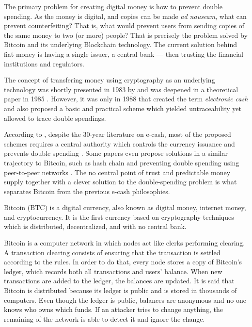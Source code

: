 The primary problem for creating digital money is how to prevent double spending. As the money is digital, and copies can be made \textit{ad nauseam}, what can prevent counterfeiting? That is, what would prevent users from sending copies of the same money to two (or more) people? That is precisely the problem solved by Bitcoin and its underlying Blockchain technology. The current solution behind fiat money is having a single issuer, a central bank --- then trusting the financial institutions and regulators.

The concept of transfering money using cryptography as an underlying technology was shortly presented in 1983 by \citet{chaum1983blind} and was deepened in a theoretical paper in 1985 \citep{chaum1985security}. However, it was only in 1988 that \citet{chaum1988untraceable} created the term \emph{electronic cash} and also proposed a basic and practical scheme which yielded untraceability yet allowed to trace double spendings.

According to \citet{barber2012bitter}, despite the 30-year literature on e-cash, most of the proposed schemes requires a central authority which controls the currency issuance and prevents double spending \citep{chaum1983blind, okamoto1995efficient, camenisch2005compact, canard2007divisible}. Some papers even propose solutions in a similar trajectory to Bitcoin, such as hash chain \citep{zongkai2004new} and preventing double spending using peer-to-peer networks \citet{osipkov2007combating, hoepman2007distributed}. The no central point of trust and predictable money supply together with a clever solution to the double-spending problem is what separates Bitcoin from the previous e-cash philosophies.

Bitcoin (BTC) is a digital currency, also known as digital money, internet money, and cryptocurrency. It is the first currency based on cryptography techniques which is distributed, decentralized, and with no central bank.

Bitcoin is a computer network in which nodes act like clerks performing clearing. A transaction clearing consists of ensuring that the transaction is settled according to the rules. In order to do that, every node stores a copy of Bitcoin's ledger, which records both all transactions and users' balance. When new transactions are added to the ledger, the balances are updated. It is said that Bitcoin is distributed because its ledger is public and is stored in thousands of computers. Even though the ledger is public, balances are anonymous and no one knows who owns which funds. If an attacker tries to change anything, the remaining of the network is able to detect it and ignore the change.

